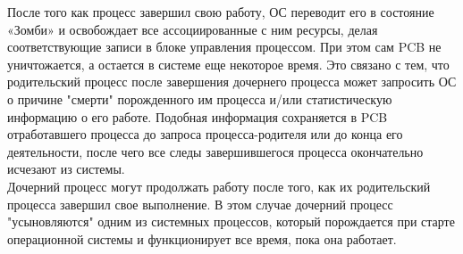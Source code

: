 \documentclass[a4paper]{article}
\begin{document}
После того как процесс завершил свою работу, ОС переводит его в состояние «Зомби» и освобождает все ассоциированные с ним ресурсы, делая соответствующие записи в блоке управления процессом. При этом сам PCB не уничтожается, а остается в системе еще некоторое время. Это связано с тем, что родительский процесс после завершения дочернего процесса может запросить ОС о причине "смерти" порожденного им процесса и/или статистическую информацию
о его работе. Подобная информация сохраняется в PCB отработавшего процесса до запроса процесса-родителя или до
конца его деятельности, после чего все следы завершившегося процесса окончательно исчезают из системы.\\
Дочерний процесс могут продолжать работу после того, как их родительский процесса завершил свое выполнение. В этом случае дочерний процесс "усыновляются" одним из системных процессов, который порождается при старте операционной системы и функционирует все время, пока она работает.
\end{document}
